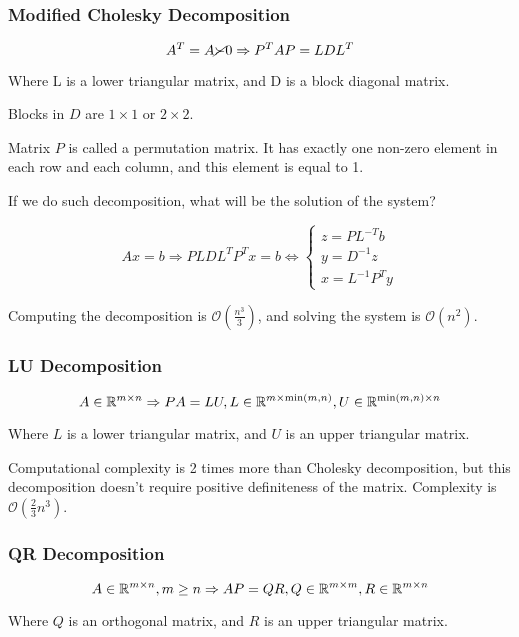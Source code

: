 \subsubsection{Modified Cholesky Decomposition}

\[
    A^T = A \cancel{\succ} 0 \Rightarrow P^T A P = L D L^T
\]

Where L is a lower triangular matrix, and D is a block diagonal matrix. 

\notice \; Blocks in $D$ are $1 \times 1$ or $2 \times 2$.

\notice \; Matrix $P$ is called a permutation matrix. It has exactly one non-zero element in each row and each column, and this element is equal to 1.

If we do such decomposition, what will be the solution of the system?

\[ 
    A x = b \Longrightarrow P L D L^T P^T x = b \Longleftrightarrow \begin{cases}
        z = P L^{-T} b \\
        y = D^{-1} z \\
        x = L^{-1} P^T y
    \end{cases}
\]

Computing the decomposition is $\mathcal{O}(\frac{n^3}{3})$, and solving the system is $\mathcal{O}(n^2)$.

\subsubsection{LU Decomposition}

\[
    A \in \mathbb{R}^{m \times n} \Rightarrow P A = L U, L \in \mathbb{R}^{m \times \min(m, n)}, U \in \mathbb{R}^{\min(m, n) \times n}
\]

Where $L$ is a lower triangular matrix, and $U$ is an upper triangular matrix.

\notice \; Computational complexity is 2 times more than Cholesky decomposition, but this decomposition doesn't require positive definiteness of the matrix. Complexity is $\mathcal{O}(\frac{2}{3} n^3)$.

\subsubsection{QR Decomposition}

\[
    A \in \mathbb{R}^{m \times n}, m \geq n \Rightarrow A P = Q R, Q \in \mathbb{R}^{m \times m}, R \in \mathbb{R}^{m \times n}
\]

Where $Q$ is an orthogonal matrix, and $R$ is an upper triangular matrix.

